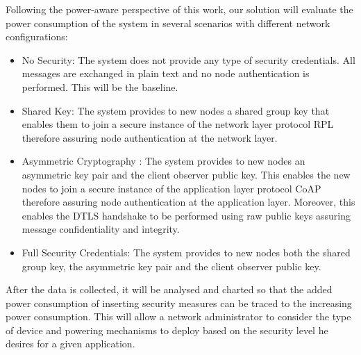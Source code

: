 Following the power-aware perspective of this work, our solution will evaluate the power consumption of the system in several scenarios with different network configurations:

\begin{itemize}
	\item No Security: The system does not provide any type of security credentials. All messages are exchanged in plain text and no node authentication is performed. This will be the baseline.\\
	\item Shared Key: The system provides to new nodes a shared group key that enables them to join a secure instance of the network layer protocol RPL therefore assuring node authentication at the network layer.\\
	\item Asymmetric Cryptography : The system provides to new nodes an asymmetric key pair and the client observer public key. This enables the new nodes to join a secure instance of the application layer protocol \ac{CoAP} therefore assuring node authentication at the application layer. Moreover, this enables the \ac{DTLS} handshake to be performed using raw public keys assuring message confidentiality and integrity.\\
	\item Full Security Credentials: The system provides to new nodes both the shared group key, the asymmetric key pair and the client observer public key. 
\end{itemize}

After the data is collected, it will be analysed and charted so that the added power consumption of inserting security measures can be traced to the increasing power consumption. This will allow a network administrator to consider the type of device and powering mechanisms to deploy based on the security level he desires for a given application.